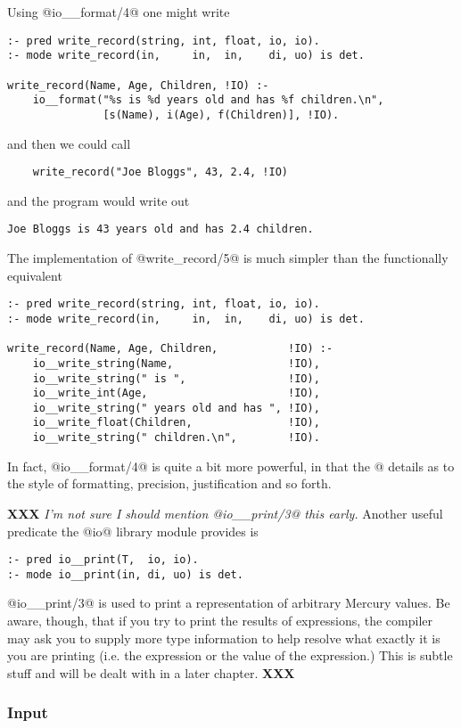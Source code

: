 \documentclass[a4paper,11pt,notitlepage,onecolumn]{article}
\newcommand{\XXX}[1]%
{{\small\textbf{XXX} \emph{#1}}}
\begin{document}
Using @io__format/4@ one might write
\begin{verbatim}
:- pred write_record(string, int, float, io, io).
:- mode write_record(in,     in,  in,    di, uo) is det.

write_record(Name, Age, Children, !IO) :-
    io__format("%s is %d years old and has %f children.\n",
               [s(Name), i(Age), f(Children)], !IO).
\end{verbatim}
and then we could call
\begin{verbatim}
    write_record("Joe Bloggs", 43, 2.4, !IO)
\end{verbatim}
and the program would write out
\begin{verbatim}
Joe Bloggs is 43 years old and has 2.4 children.
\end{verbatim}
The implementation of @write_record/5@ is much simpler than the
functionally equivalent
\begin{verbatim}
:- pred write_record(string, int, float, io, io).
:- mode write_record(in,     in,  in,    di, uo) is det.

write_record(Name, Age, Children,           !IO) :-
    io__write_string(Name,                  !IO),
    io__write_string(" is ",                !IO),
    io__write_int(Age,                      !IO),
    io__write_string(" years old and has ", !IO),
    io__write_float(Children,               !IO),
    io__write_string(" children.\n",        !IO).
\end{verbatim}

In fact, @io__format/4@ is quite a bit more powerful, in
that the @%
details as to the style of formatting, precision,
justification and so forth.

\XXX{I'm not sure I should mention @io\_\_print/3@ this early.}
Another useful predicate the @io@ library module provides is
\begin{verbatim}
:- pred io__print(T,  io, io).
:- mode io__print(in, di, uo) is det.
\end{verbatim}
@io__print/3@ is used to print a representation of arbitrary
Mercury values.  Be aware, though, that if you try to
print the results of expressions, the compiler may ask you
to supply more type information to help resolve what
exactly it is you are printing (i.e. the expression or the
value of the expression.)  This is subtle stuff and will
be dealt with in a later chapter. \XXX{}

\subsubsection{Input}
\end{document}
